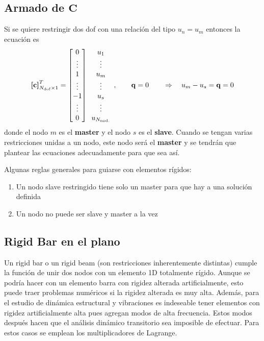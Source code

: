 \subsection*{Armado de $\mathbf{C}$}
Si se quiere restringir dos dof con una relación del tipo $u_n=u_m$ entonces la ecuación es
\[
\boldsymbol{[}\mathbf{c} \boldsymbol{]}^T_{N_{\mathrm{dof}} \times 1} = \begin{bmatrix}
0 \\ 
\vdots \\
1 \\
\vdots \\
-1 \\
\vdots \\
0
\end{bmatrix}\begin{array}{c}
u_1\\
\vdots \\
u_m \\
\vdots \\
u_s \\
\vdots \\
u_{N_{\mathrm{nod.}}}
\end{array}
,
\qquad 
\mathbf{q} = 0
\qquad \Rightarrow \quad u_m-u_s = \mathbf{q} = 0
\]
donde el nodo $m$ es el \textbf{master} y el nodo $s$ es el \textbf{slave}. Cuando se tengan varias restricciones unidas a un nodo, este nodo será el \textbf{master} y se tendrán que plantear las ecuaciones adecuadamente para que sea así.

 Algunas reglas generales para guiarse con elementos rígidos:
\begin{enumerate}
	\item Un nodo slave restringido tiene solo un master para que hay a una solución definida
	\item Un nodo no puede ser slave y master a la vez
\end{enumerate}


\subsection*{Rigid Bar en el plano}
Un rigid bar o un rigid beam (son restricciones inherentemente distintas) cumple la función de unir dos nodos con un elemento 1D totalmente rígido. Aunque se podría hacer con un elemento barra con rigidez alterada artificialmente, esto puede traer problemas numéricos si la rigidez alterada es muy alta. Además, para el estudio de dinámica estructural y vibraciones es indeseable tener elementos con rigidez artificialmente alta pues agregan modos de alta frecuencia. Estos modos después hacen que el análisis dinámico transitorio sea imposible de efectuar. Para estos casos se emplean los multiplicadores de Lagrange.

